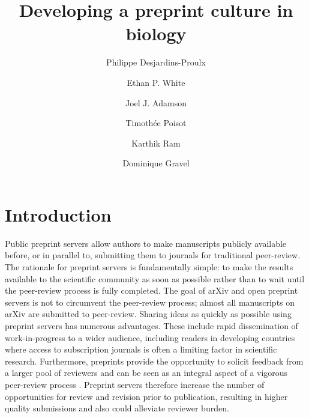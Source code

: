 \documentclass[letterpaper,twocolumn,superscriptaddress,showkeys,longbibliography]{revtex4-1}
\begin{document}
\title{Developing a preprint culture in biology}

\author{Philippe Desjardins-Proulx}

\author{Ethan P. White}

\author{Joel J. Adamson}

\author{Timoth\'ee Poisot}

\author{Karthik Ram}

\author{Dominique Gravel}


\maketitle

\section{Introduction}

Public preprint servers allow authors to make manuscripts publicly available
before, or in parallel to, submitting them to journals for traditional
peer-review. The rationale for preprint servers is fundamentally simple: to make
the results available to the scientific community as soon as possible rather
than to wait until the peer-review process is fully completed. The goal of arXiv
and open preprint servers is not to circumvent the peer-review process; almost all
manuscripts on arXiv are submitted to peer-review.  Sharing ideas as quickly as
possible using preprint servers has numerous advantages.  These include rapid
dissemination of work-in-progress to a wider audience, including readers in
developing countries where access to subscription journals is often a limiting
factor in scientific research.  Furthermore, preprints provide the opportunity
to solicit feedback from a larger pool of reviewers and can be seen as an
integral aspect of a vigorous peer-review process \cite{hoc12}.  Preprint
servers therefore increase the number of opportunities for review and revision
prior to publication, resulting in higher quality submissions and also could
alleviate reviewer burden.
\end{document}
